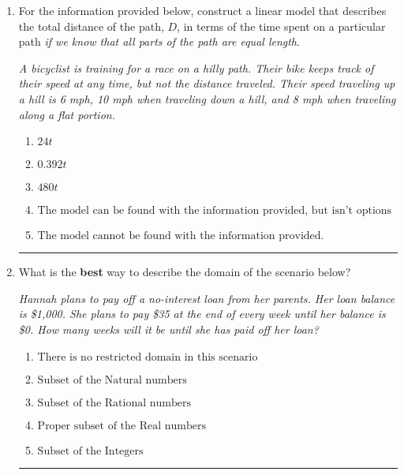 \documentclass[14pt]{extbook}
\newcommand{\litem}[1]{\item#1\hspace*{-1cm}\rule{\textwidth}{0.4pt}}
\begin{document}
\begin{enumerate}
{\begin{enumerate}[label=\Alph*.]
\end{enumerate} }
\litem{
For the information provided below, construct a linear model that describes the total distance of the path, $D$, in terms of the time spent on a particular path \textit{if we know that all parts of the path are equal length}.
\begin{center}
    \textit{ A bicyclist is training for a race on a hilly path. Their bike keeps track of their speed at any time, but not the distance traveled. Their speed traveling up a hill is 6 mph, 10 mph when traveling down a hill, and 8 mph when traveling along a flat portion. }
\end{center}
\begin{enumerate}[label=\Alph*.]
\item \( 24 t \)
\item \( 0.392 t \)
\item \( 480 t \)
\item \( \text{The model can be found with the information provided, but isn't options 1-3.} \)
\item \( \text{The model cannot be found with the information provided.} \)

\end{enumerate} }
\litem{
What is the \textbf{best} way to describe the domain of the scenario below?
\begin{center}
    \textit{ Hannah plans to pay off a no-interest loan from her parents. Her loan balance is \$1,000. She plans to pay \$35 at the end of every week until her balance is \$0. How many weeks will it be until she has paid off her loan? }
\end{center}
\begin{enumerate}[label=\Alph*.]
\item \( \text{There is no restricted domain in this scenario} \)
\item \( \text{Subset of the Natural numbers} \)
\item \( \text{Subset of the Rational numbers} \)
\item \( \text{Proper subset of the Real numbers} \)
\item \( \text{Subset of the Integers} \)


\end{enumerate}}
\end{enumerate}
\end{document}
